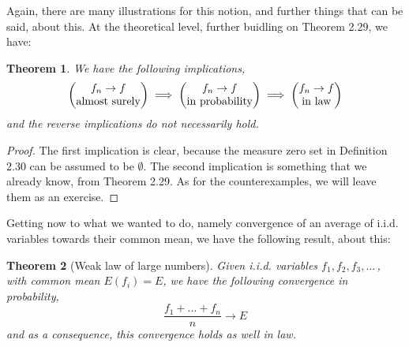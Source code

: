 \documentclass[12pt]{amsbook}
\newtheorem{theorem}{Theorem}[chapter]
\begin{document}
Again, there are many illustrations for this notion, and further things that can be said, about this. At the theoretical level, further buidling on Theorem 2.29, we have:

\begin{theorem}
We have the following implications,
$$\begin{pmatrix}f_n\to f\\ {\rm almost\ surely}\end{pmatrix}\implies
\begin{pmatrix}f_n\to f\\ {\rm in\ probability}\end{pmatrix}\implies
\begin{pmatrix}f_n\to f\\ {\rm in\ law}\end{pmatrix}$$
and the reverse implications do not necessarily hold.
\end{theorem}

\begin{proof}
The first implication is clear, because the measure zero set in Definition 2.30 can be assumed to be $\emptyset$. The second implication is something that we already know, from Theorem 2.29. As for the counterexamples, we will leave them as an exercise.
\end{proof}

Getting now to what we wanted to do, namely convergence of an average of i.i.d. variables towards their common mean, we have the following result, about this:


\begin{theorem}[Weak law of large numbers]
Given i.i.d. variables $f_1,f_2,f_3,\ldots\,$, with common mean $E(f_i)=E$, we have the following convergence in probability,
$$\frac{f_1+\ldots+f_n}{n}\to E$$
and as a consequence, this convergence holds as well in law.
\end{theorem}
\end{document}
